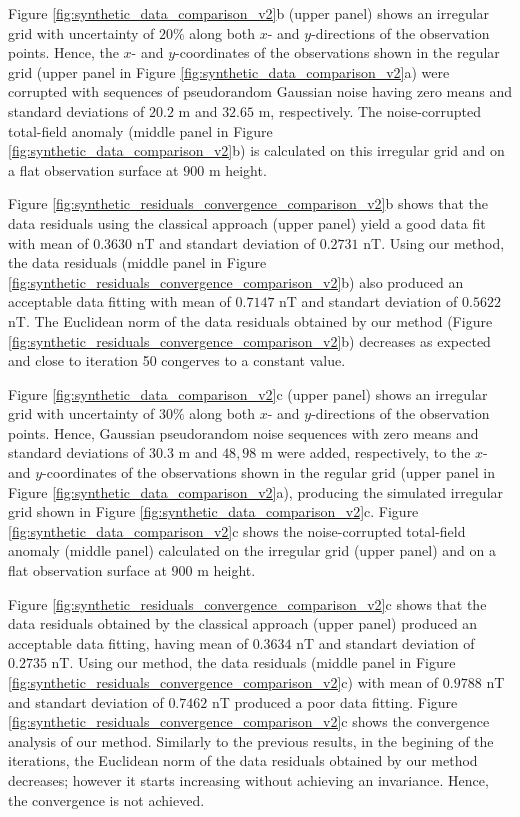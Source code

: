 
Figure \ref{fig:synthetic_data_comparison_v2}b (upper panel) shows an irregular grid with uncertainty  of $20\%$ along both $x$- and $y$-directions of the observation points. 
Hence, the $x$- and $y$-coordinates of the observations shown in the regular grid (upper panel in Figure
\ref{fig:synthetic_data_comparison_v2}a)  were corrupted with sequences of pseudorandom Gaussian noise 
having zero means and standard deviations of $20.2$ m and $32.65$ m, respectively.
The noise-corrupted total-field anomaly (middle panel in Figure \ref{fig:synthetic_data_comparison_v2}b) is calculated on this irregular grid and on a flat observation surface at $900$ m height.

Figure \ref{fig:synthetic_residuals_convergence_comparison_v2}b shows that the data residuals using the classical approach (upper panel) yield a good data fit with mean of $0.3630$ nT and standart deviation of $0.2731$ nT. 
Using our method, the data residuals (middle panel in Figure \ref{fig:synthetic_residuals_convergence_comparison_v2}b) also produced an acceptable data fitting with mean of  $0.7147$ nT and standart deviation of $0.5622$ nT. 
The  Euclidean norm of the data residuals obtained by our method 
(Figure \ref{fig:synthetic_residuals_convergence_comparison_v2}b) decreases as expected and close to iteration 50 congerves to a constant value. 



Figure \ref{fig:synthetic_data_comparison_v2}c (upper panel) shows an irregular grid with uncertainty  of $30\%$ along both $x$- and $y$-directions of the observation points.
Hence, Gaussian pseudorandom noise sequences with zero means and standard deviations of 
$30.3$ m and $48,98$ m were added, respectively, to the $x$- and $y$-coordinates of the observations shown in the regular grid (upper panel in Figure \ref{fig:synthetic_data_comparison_v2}a), producing the simulated irregular grid shown in Figure \ref{fig:synthetic_data_comparison_v2}c.
Figure \ref{fig:synthetic_data_comparison_v2}c shows the noise-corrupted total-field anomaly 
(middle panel) calculated on the irregular grid (upper panel) and on a flat observation surface at $900$ m height.

Figure \ref{fig:synthetic_residuals_convergence_comparison_v2}c shows that the data residuals obtained by the classical approach (upper panel) produced an acceptable data fitting, having mean of $0.3634$ nT and standart deviation of $0.2735$ nT. 
Using our method, the data residuals (middle panel in Figure \ref{fig:synthetic_residuals_convergence_comparison_v2}c) with mean of $0.9788$ nT and standart deviation of $0.7462$ nT produced a poor data fitting.
Figure \ref{fig:synthetic_residuals_convergence_comparison_v2}c shows the convergence analysis of our method.
Similarly to the previous results, in the begining of the iterations, the Euclidean norm of the data residuals obtained by our method decreases; however it starts increasing without achieving an invariance.
Hence, the convergence is not achieved. 


